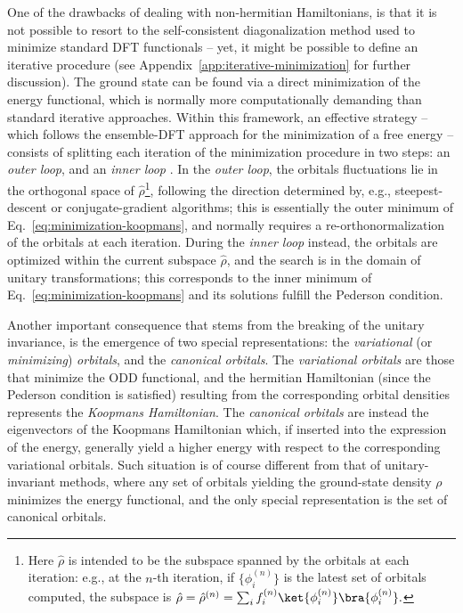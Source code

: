 One of the drawbacks of dealing with non-hermitian Hamiltonians, is that it is not possible to resort to the self-consistent diagonalization method used to minimize standard DFT functionals -- yet, it might be possible to define an iterative procedure (see Appendix~\ref{app:iterative-minimization} for further discussion). The ground state can be found via a direct minimization of the energy functional, which is normally more computationally demanding than standard iterative approaches. Within this framework, an effective strategy -- which follows the ensemble-DFT approach for the minimization of a free energy \cite{marzari_ensemble_1997} -- consists of splitting each iteration of the minimization procedure in two steps: an \emph{outer loop}, and an \emph{inner loop} \cite{borghi_variational_2015,stengel_self-interaction_2008,klupfel_optimization_2012}. In the \emph{outer loop}, the orbitals fluctuations lie in the orthogonal space of $\hat{\rho}$\footnote{Here $\hat{\rho}$ is intended to be the subspace spanned by the orbitals at each iteration: e.g., at the $n$-th iteration, if $\{ \phi_i^{(n)} \}$ is the latest set of orbitals computed, the subspace is $\hat{\rho} = \hat{\rho}^{(n)} = \sum_i f_i^{(n)} \ket{\phi_i^{(n)}}\bra{\phi_i^{(n)}}.$}, following the direction determined by, e.g., steepest-descent or conjugate-gradient algorithms; this is essentially the outer minimum of Eq.~\eqref{eq:minimization-koopmans}, and normally requires a re-orthonormalization of the orbitals at each iteration. During the \emph{inner loop} instead, the orbitals are optimized within the current subspace $\hat{\rho}$, and the search is in the domain of unitary transformations; this corresponds to the inner minimum of Eq.~\eqref{eq:minimization-koopmans} and its solutions fulfill the Pederson condition.

Another important consequence that stems from the breaking of the unitary invariance, is the emergence of two special representations: the \emph{variational} (or \emph{minimizing}) \emph{orbitals}, and the \emph{canonical orbitals}. The \emph{variational orbitals} are those that minimize the ODD functional, and the hermitian Hamiltonian (since the Pederson condition is satisfied) resulting from the corresponding orbital densities represents the \emph{Koopmans Hamiltonian}. The \emph{canonical orbitals} are instead the eigenvectors of the Koopmans Hamiltonian which, if inserted into the expression of the energy, generally yield a higher energy with respect to the corresponding variational orbitals. Such situation is of course different from that of unitary-invariant methods, where any set of orbitals yielding the ground-state density $\rho$ minimizes the energy functional, and the only special representation is the set of canonical orbitals.

